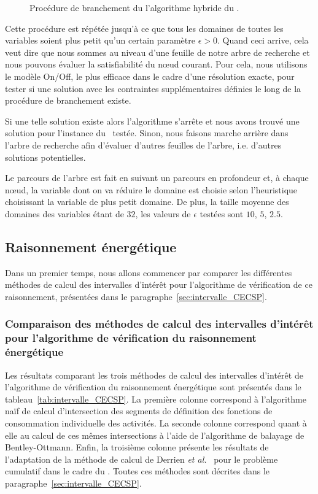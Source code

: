 \begin{figure}[!htb] 
  
  \caption{Procédure de branchement du l'algorithme hybride du \CECSP.}
  \label{fig:branching}
\end{figure}

Cette procédure est répétée jusqu'à ce que tous les domaines de toutes
les variables soient plus petit qu'un certain paramètre $\epsilon
>0$. Quand ceci arrive, cela veut dire que nous sommes au niveau d'une
feuille de notre arbre de recherche et nous pouvons évaluer la
satisfiabilité du n\oe ud courant. Pour cela, nous utilisons le modèle
On/Off, le plus efficace dans le cadre d'une résolution exacte, pour
tester si une solution avec les contraintes supplémentaires définies
le long de la procédure de branchement existe.

Si une telle solution existe alors l'algorithme s'arrête et nous avons
trouvé une solution pour l'instance du \CECSP~testée. Sinon, nous
faisons marche arrière dans l'arbre de recherche afin d'évaluer
d'autres feuilles de l'arbre, i.e. d'autres solutions potentielles. 

Le parcours de l'arbre est fait en suivant un parcours en profondeur
et, à chaque n\oe ud, la variable dont on va réduire le domaine est
choisie selon l'heuristique choisissant la variable de plus petit
domaine.  De plus, la taille moyenne des domaines des variables étant
de $32$, les valeurs de $\epsilon$ testées sont $10$, $5$, $2.5$.

\subsection{Raisonnement énergétique}
\label{sec:expe_RE}

Dans un premier temps, nous allons commencer par comparer les
différentes méthodes de calcul des intervalles d'intérêt pour
l'algorithme de vérification de ce raisonnement, présentées dans le
paragraphe~\ref{sec:intervalle_CECSP}. 

\subsubsection{Comparaison des méthodes de calcul des intervalles
  d'intérêt pour l'algorithme de vérification du raisonnement
  énergétique}

Les résultats comparant les trois méthodes de calcul des intervalles
d'intérêt de l'algorithme de vérification du raisonnement énergétique
sont présentés dans le tableau~\ref{tab:intervalle_CECSP}. La première
colonne correspond à l'algorithme naïf de calcul d'intersection des
segments de définition des fonctions de consommation individuelle des
activités. La seconde colonne correspond quant à elle au calcul de ces
mêmes intersections à l'aide de l'algorithme de balayage de
Bentley-Ottmann. Enfin, la troisième colonne présente les résultats de
l'adaptation de la méthode de calcul de Derrien {\it et al.}~\cite{DP}
pour le problème cumulatif dans le cadre du \CECSP. Toutes ces
méthodes sont décrites dans le
paragraphe~\ref{sec:intervalle_CECSP}.

